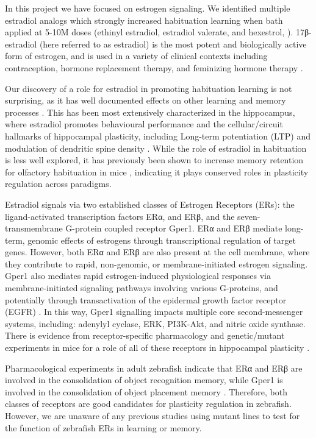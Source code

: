 \documentclass[9.5pt,lineno]{RandlettLab_elife}
\begin{document}
In this project we have focused on estrogen signaling. 
We identified multiple estradiol analogs which strongly increased habituation learning when bath applied at 5-10\textmu M doses (ethinyl estradiol, estradiol valerate, and hexestrol, \citealp{Lamire2023-he}).
17β-estradiol (here referred to as estradiol) is the most potent and biologically active form of estrogen, and is used in a variety of clinical contexts including contraception, hormone replacement therapy, and feminizing hormone therapy \citep{Kuhl2005-jz, Unger2016-at, Farkas2022-na}. 

Our discovery of a role for estradiol in promoting habituation learning is not surprising, as it has well documented effects on other learning and memory processes \citep{Frick2015-uy}. 
This has been most extensively characterized in the hippocampus, where estradiol promotes behavioural performance and the cellular/circuit hallmarks of hippocampal plasticity, including Long-term potentiation (LTP) and modulation of dendritic spine density \citep{Iqbal2024-yo, Luine2014-cj, Finney2020-ng, Nilsson2002-as}. 
While the role of estradiol in habituation is less well explored, it has previously been shown to increase memory retention for olfactory habituation in mice \citep{Dillon2013-rk}, indicating it plays conserved roles in plasticity regulation across paradigms.

Estradiol signals via two established classes of Estrogen Receptors (ERs): the ligand-activated transcription factors ERα, and ERβ, and the seven-transmembrane G-protein coupled receptor Gper1.
ERα and ERβ mediate long-term, genomic effects of estrogens through transcriptional regulation of target genes. 
However, both ERα and ERβ are also present at the cell membrane, where they contribute to rapid, non-genomic, or membrane-initiated estrogen signaling.
Gper1 also mediates rapid estrogen-induced physiological responses via membrane-initiated signaling pathways involving various G-proteins, and potentially through transactivation of the epidermal growth factor receptor (EGFR) \citep{Prossnitz2023-uo, Revankar2005-ww, Filardo2000-yz}.
In this way, Gper1 signalling impacts multiple core second-messenger systems, including: adenylyl cyclase, ERK, PI3K-Akt, and nitric oxide synthase. 
There is evidence from receptor-specific pharmacology and genetic/mutant experiments in mice for a role of all of these receptors in hippocampal plasticity \citep{Finney2020-ng, Koitmae2023-vm, Briz2015-yt}. 

Pharmacological experiments in adult zebrafish indicate that ERα and ERβ are involved in the consolidation of object recognition memory, while Gper1 is involved in the consolidation of object placement memory \citep{Naderi2020-cg}. 
Therefore, both classes of receptors are good candidates for plasticity regulation in zebrafish. However, we are unaware of any previous studies using mutant lines to test for the function of zebrafish ERs in learning or memory. 
\end{document}
